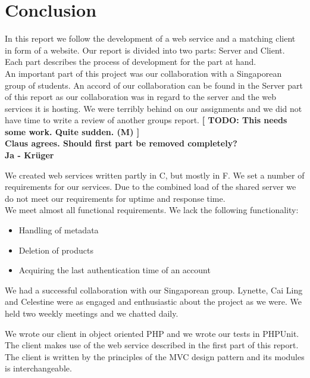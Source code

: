 \section{Conclusion}
In this report we follow the development of a web service and a matching client in form of a website. Our report is divided into two parts: Server and Client. Each part describes the process of development for the part at hand.
\\An important part of this project was our collaboration with a Singaporean group of students. An accord of our collaboration can be found in the Server part of this report as our collaboration was in regard to the server and the web services it is hosting.
We were terribly behind on our assignments and we did not have time to write a review of another groups report. \textbf{[ TODO: This needs some work. Quite sudden. (M) ]}
\\\textbf{Claus agrees. Should first part be removed completely?\\Ja - Krüger}

We created web services written partly in C\Sh, but mostly in F\Sh. We set a number of requirements for our services. Due to the combined load of the shared server we do not meet our requirements for uptime and response time.
\\We meet almost all functional requirements. We lack the following functionality:
\begin{itemize}
\item Handling of metadata
\item Deletion of products
\item Acquiring the last authentication time of an account
\end{itemize}

We had a successful collaboration with our Singaporean group. Lynette, Cai Ling and Celestine were as engaged and enthusiastic about the project as we were. We held two weekly meetings and we chatted daily.
\\


We wrote our client in object oriented PHP and we wrote our tests in PHPUnit. The client makes use of the web service described in the first part of this report. The client is written by the principles of the MVC design pattern and its modules is interchangeable.

